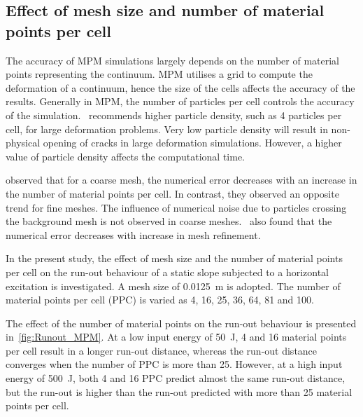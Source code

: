 \subsection{Effect of mesh size and number of material points per cell}
\label{sec:MPM_points_per_cell}

The accuracy of MPM simulations largely depends on the number of material 
points representing the continuum. MPM utilises a grid to compute the 
deformation of a continuum, hence the size of the cells affects the accuracy 
of the results. Generally in MPM, the number of particles per cell controls 
the accuracy of the simulation.~\citet{Guilkey2003} recommends higher particle 
density, such as 4 particles per cell, for large deformation problems. Very low 
particle density will result in non-physical opening of cracks in large 
deformation simulations. However, a higher value of particle density affects 
the computational time. 

\citet{Abe2013} observed that for a coarse mesh, the numerical error 
decreases with an increase in the number of material points per cell. In 
contrast, they observed an opposite trend for fine meshes. The influence of 
numerical noise due to particles crossing the background mesh is not observed 
in coarse meshes.~\citet{Coetzee2005} also found that the numerical error 
decreases with increase in mesh refinement.

In the present study, the effect of mesh size and the number of material points 
per cell on the run-out behaviour of a static slope subjected to a horizontal 
excitation is investigated. A mesh size of 0.0125~\si{\m} is adopted. The 
number of material points per cell (PPC) is varied as 4, 16, 25, 36, 64, 81 and 
100.

The effect of the number of material points on the run-out behaviour is 
presented in~\cref{fig:Runout_MPM}. At a low input energy of 50~\si{\J}, 4 and 
16 material points per cell result in a longer run-out distance, whereas the 
run-out distance converges when the number of PPC is more than 25. However, at 
a high input energy of 500~\si{J}, both 4 and 16 PPC predict almost the same 
run-out distance, but the run-out is higher than the run-out predicted with 
more than 25 material points per cell. 

